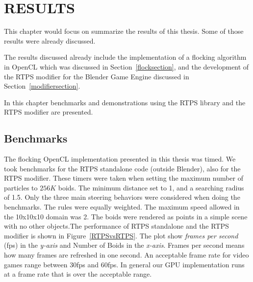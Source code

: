 \chapter{RESULTS}\label{resultsChapter}

This chapter would focus on summarize the results of this thesis. Some of those results were already discussed. 

The results discussed already include the implementation of a flocking algorithm in OpenCL which was discussed in Section~\ref{flocksection}, and the development of the RTPS modifier for the Blender Game Engine discussed in Section~\ref{modifiersection}. 

In this chapter benchmarks and demonstrations using the RTPS library and the RTPS modifier are presented.

\section{Benchmarks}

The flocking OpenCL implementation presented in this thesis was timed. We took benchmarks for the RTPS standalone code (outside Blender), also for the RTPS modifier. These timers were taken when setting the maximum number of particles to $256K$ boids. The minimum distance set to 1, and a searching radius of 1.5. Only the three main steering behaviors were considered when doing the benchmarks. The rules were equally weighted. The maximum speed allowed in the 10x10x10 domain was 2. The boids were rendered as points in a simple scene with no other objects.The performance of RTPS standalone and the RTPS modifier is shown in Figure~\ref{RTPSvsRTPS}. The plot show \textit{frames per second} (fps) in the \textit{y-axis} and Number of Boids in the \textit{x-axis}. Frames per second means how many frames are refreshed in one second. An acceptable frame rate for video games range between 30fps and 60fps. In general our GPU implementation runs at a frame rate that is over the acceptable range. 

